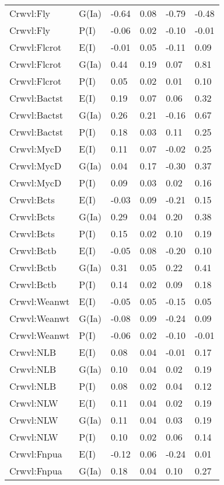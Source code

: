 \begin{center}
\begin{longtable}{|p{1.1in}|p{0.7in}|p{0.7in}|p{0.6in}|p{0.6in}|p{0.6in}|}
  Crwvl:Fly & G(Ia) & -0.64 & 0.08 & -0.79 & -0.48 \\ 
  Crwvl:Fly & P(I) & -0.06 & 0.02 & -0.10 & -0.01 \\ 
  Crwvl:Flcrot & E(I) & -0.01 & 0.05 & -0.11 & 0.09 \\ 
  Crwvl:Flcrot & G(Ia) & 0.44 & 0.19 & 0.07 & 0.81 \\ 
  Crwvl:Flcrot & P(I) & 0.05 & 0.02 & 0.01 & 0.10 \\ 
  Crwvl:Bactst & E(I) & 0.19 & 0.07 & 0.06 & 0.32 \\ 
  Crwvl:Bactst & G(Ia) & 0.26 & 0.21 & -0.16 & 0.67 \\ 
  Crwvl:Bactst & P(I) & 0.18 & 0.03 & 0.11 & 0.25 \\ 
  Crwvl:MycD & E(I) & 0.11 & 0.07 & -0.02 & 0.25 \\ 
  Crwvl:MycD & G(Ia) & 0.04 & 0.17 & -0.30 & 0.37 \\ 
  Crwvl:MycD & P(I) & 0.09 & 0.03 & 0.02 & 0.16 \\ 
  Crwvl:Bcts & E(I) & -0.03 & 0.09 & -0.21 & 0.15 \\ 
  Crwvl:Bcts & G(Ia) & 0.29 & 0.04 & 0.20 & 0.38 \\ 
  Crwvl:Bcts & P(I) & 0.15 & 0.02 & 0.10 & 0.19 \\ 
  Crwvl:Bctb & E(I) & -0.05 & 0.08 & -0.20 & 0.10 \\ 
  Crwvl:Bctb & G(Ia) & 0.31 & 0.05 & 0.22 & 0.41 \\ 
  Crwvl:Bctb & P(I) & 0.14 & 0.02 & 0.09 & 0.18 \\ 
  Crwvl:Weanwt & E(I) & -0.05 & 0.05 & -0.15 & 0.05 \\ 
  Crwvl:Weanwt & G(Ia) & -0.08 & 0.09 & -0.24 & 0.09 \\ 
  Crwvl:Weanwt & P(I) & -0.06 & 0.02 & -0.10 & -0.01 \\ 
  Crwvl:NLB & E(I) & 0.08 & 0.04 & -0.01 & 0.17 \\ 
  Crwvl:NLB & G(Ia) & 0.10 & 0.04 & 0.02 & 0.19 \\ 
  Crwvl:NLB & P(I) & 0.08 & 0.02 & 0.04 & 0.12 \\ 
  Crwvl:NLW & E(I) & 0.11 & 0.04 & 0.02 & 0.19 \\ 
  Crwvl:NLW & G(Ia) & 0.11 & 0.04 & 0.03 & 0.19 \\ 
  Crwvl:NLW & P(I) & 0.10 & 0.02 & 0.06 & 0.14 \\ 
  Crwvl:Fnpua & E(I) & -0.12 & 0.06 & -0.24 & 0.01 \\ 
  Crwvl:Fnpua & G(Ia) & 0.18 & 0.04 & 0.10 & 0.27 \\ 

\end{longtable}
\end{center}
